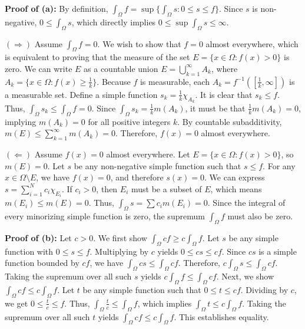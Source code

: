 \begin{pfbox}
    \textbf{Proof of (a):} 
    By definition, $\int_\Omega f = \sup \{ \int_\Omega s : 0 \le s \le f \}$. Since $s$ is non-negative, $0 \le \int_\Omega s$, which directly implies $0 \le \sup \int_\Omega s \le \infty$.
    
    $(\Rightarrow)$ Assume $\int_\Omega f = 0$. We wish to show that $f=0$ almost everywhere, which is equivalent to proving that the measure of the set $E = \{x \in \Omega : f(x) > 0\}$ is zero.
    We can write $E$ as a countable union $E = \displaystyle\bigcup_{k=1}^\infty A_k$, where $A_k = \{x \in \Omega : f(x) \ge \frac{1}{k}\}$. Because $f$ is measurable, each $A_k = f^{-1}([\frac{1}{k}, \infty])$ is a measurable set.
    Define a simple function $s_k = \frac{1}{k} \chi_{A_k}$. It is clear that $s_k \le f$. Thus, $\int_\Omega s_k \le \int_\Omega f = 0$. Since $\int_\Omega s_k = \frac{1}{k} m(A_k)$, it must be that $\frac{1}{k} m(A_k) = 0$, implying $m(A_k) = 0$ for all positive integers $k$.
    By countable subadditivity, $m(E) \le \displaystyle\sum_{k=1}^\infty m(A_k) = 0$. Therefore, $f(x) = 0$ almost everywhere.
    
    $(\Leftarrow)$ Assume $f(x) = 0$ almost everywhere. Let $E = \{x \in \Omega : f(x) > 0\}$, so $m(E) = 0$. Let $s$ be any non-negative simple function such that $s \le f$. For any $x \in \Omega \setminus E$, we have $f(x) = 0$, and therefore $s(x) = 0$.
    We can express $s = \displaystyle\sum_{i=1}^N c_i \chi_{E_i}$. If $c_i > 0$, then $E_i$ must be a subset of $E$, which means $m(E_i) \le m(E) = 0$. Thus, $\int_\Omega s = \displaystyle\sum c_i m(E_i) = 0$. Since the integral of every minorizing simple function is zero, the supremum $\int_\Omega f$ must also be zero.

    \textbf{Proof of (b):} Let $c > 0$. We first show $\int_\Omega cf \ge c \int_\Omega f$. Let $s$ be any simple function with $0 \le s \le f$. Multiplying by $c$ yields $0 \le cs \le cf$. Since $cs$ is a simple function bounded by $cf$, we have $\int_\Omega cs \le \int_\Omega cf$. Therefore, $c \int_\Omega s \le \int_\Omega cf$. Taking the supremum over all such $s$ yields $c \int_\Omega f \le \int_\Omega cf$.
    Next, we show $\int_\Omega cf \le c \int_\Omega f$. Let $t$ be any simple function such that $0 \le t \le cf$. Dividing by $c$, we get $0 \le \frac{t}{c} \le f$. Thus, $\int_\Omega \frac{t}{c} \le \int_\Omega f$, which implies $\int_\Omega t \le c \int_\Omega f$. Taking the supremum over all such $t$ yields $\int_\Omega cf \le c \int_\Omega f$. This establishes equality.


\end{pfbox}
